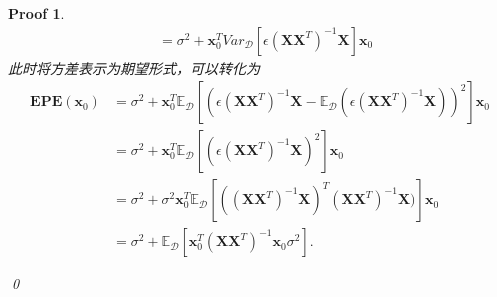 \documentclass[a4paper,UTF8]{article}
\numberwithin{equation}{section}
\newtheorem*{myProof}{Proof}
\begin{document}
\begin{myProof}
\begin{align*}
& = \sigma^2 + \textbf{x}_0^T Var_{\mathcal{D}}[\epsilon(\textbf{X}\textbf{X}^T)^{-1}\textbf{X}] \textbf{x}_0
\end{align*}
此时将方差表示为期望形式，可以转化为
\begin{align*}
\mathbf{EPE}(\textbf{x}_0) & = \sigma^2 + \textbf{x}_0^T  \mathbb{E}_{\mathcal{D}} [(\epsilon(\textbf{X}\textbf{X}^T)^{-1}\textbf{X} -  \mathbb{E}_{\mathcal{D}} (\epsilon(\textbf{X}\textbf{X}^T)^{-1}\textbf{X}))^2] \textbf{x}_0 \\
& = \sigma^2 + \textbf{x}_0^T  \mathbb{E}_{\mathcal{D}}[(\epsilon(\textbf{X}\textbf{X}^T)^{-1}\textbf{X})^2]\textbf{x}_0  \\
& = \sigma^2 + \sigma^2 \textbf{x}_0^T  \mathbb{E}_{\mathcal{D}} [((\textbf{X}\textbf{X}^T)^{-1}\textbf{X})^T(\textbf{X}\textbf{X}^T)^{-1}\textbf{X})]\textbf{x}_0 \\
& = \sigma^2+\mathbb{E}_{\mathcal{D}}[\textbf{x}_0^T(\textbf{X}\textbf{X}^T)^{-1}\textbf{x}_0\sigma^2].
\end{align*}

\qed
\end{myProof}
\end{document}
